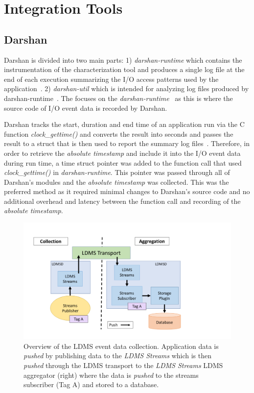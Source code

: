 \section{Integration Tools}
\label{sec:integration}
\subsection{Darshan}
Darshan is divided into two main parts: 1) \emph{darshan-runtime} which contains the instrumentation of the characterization tool and produces a single log file at the end of each execution summarizing the I/O access patterns used by the application~\cite{darshan-doc}. 2) \emph{darshan-util} which is intended for analyzing log files produced by darshan-runtime~\cite{darshan-doc}. The \Darshan{} focuses on the \emph{darshan-runtime}~\cite{darshan-runtime} as this is where the source code of I/O event data is recorded by Darshan.

Darshan tracks the start, duration and end time of an application run via the C function \emph{clock\_gettime()} and converts the result into seconds and passes the result to a struct that is then used to report the summary log files~\cite{darshangithub}. Therefore, in order to retrieve the \emph{absolute timestamp} and include it into the I/O event data during run time, a time struct pointer was added to the function call that used \emph{clock\_gettime()} in \emph{darshan-runtime}. This pointer was passed through all of Darshan's modules and the \emph{absolute timestamp} was collected. This was the preferred method as it required minimal changes to Darshan's source code and no additional overhead and latency between the function call and recording of the \emph{absolute timestamp}. 

\begin{figure}
	\centering
	\includegraphics[trim=0 1cm 1 1.5cm ,clip,width=1.2\linewidth]{figs/ldms-overview.pdf}
	\caption{Overview of the LDMS event data collection. Application data is \emph{pushed} by publishing data to the \emph{LDMS Streams} which is then \emph{pushed} through the LDMS transport to the \emph{LDMS Streams} LDMS aggregator (right) where the data is \emph{pushed} to the streams subscriber (Tag A) and stored to a database.}
	\label{f:LDMS Overview}
\end{figure}

